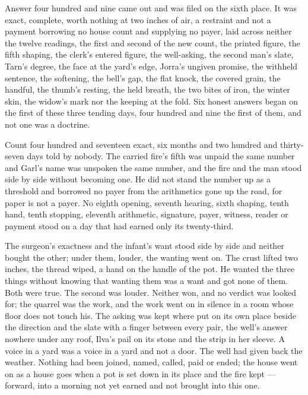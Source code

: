Answer four hundred and nine came out and was filed on the sixth place. It was exact, complete, worth nothing at two inches of air, a restraint and not a payment borrowing no house count and supplying no payer, laid across neither the twelve readings, the first and second of the new count, the printed figure, the fifth shaping, the clerk's entered figure, the well-asking, the second man's slate, Tarn's degree, the face at the yard's edge, Jorra's ungiven promise, the withheld sentence, the softening, the bell's gap, the flat knock, the covered grain, the handful, the thumb's resting, the held breath, the two bites of iron, the winter skin, the widow's mark nor the keeping at the fold. Six honest answers began on the first of these three tending days, four hundred and nine the first of them, and not one was a doctrine.

Count four hundred and seventeen exact, six months and two hundred and thirty-seven days told by nobody. The carried fire's fifth was unpaid the same number and Garl's name was unspoken the same number, and the fire and the man stood side by side without becoming one. He did not stand the number up as a threshold and borrowed no payer from the arithmetics gone up the road, for paper is not a payer. No eighth opening, seventh hearing, sixth shaping, tenth hand, tenth stopping, eleventh arithmetic, signature, payer, witness, reader or payment stood on a day that had earned only its twenty-third.

The surgeon's exactness and the infant's want stood side by side and neither bought the other; under them, louder, the wanting went on. The crust lifted two inches, the thread wiped, a hand on the handle of the pot. He wanted the three things without knowing that wanting them was a want and got none of them. Both were true. The second was louder. Neither won, and no verdict was looked for; the quarrel was the work, and the work went on in silence in a room whose floor does not touch his. The asking was kept where put on its own place beside the direction and the slate with a finger between every pair, the well's answer nowhere under any roof, Ilva's pail on its stone and the strip in her sleeve. A voice in a yard was a voice in a yard and not a door. The well had given back the weather. Nothing had been joined, named, called, paid or ended; the house went on as a house goes when a pot is set down in its place and the fire kept --- forward, into a morning not yet earned and not brought into this one.
